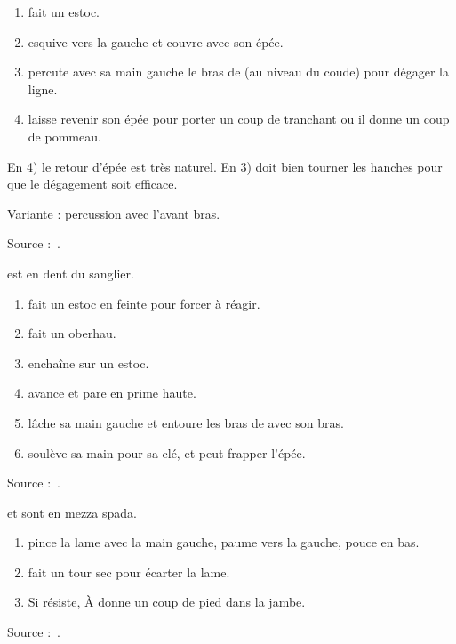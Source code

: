 \begin{technique}

\begin{enumerate}
	\item \A fait un estoc.
	\item \D esquive vers la gauche et couvre avec son épée.
	\item \D percute avec sa main gauche le bras de \A (au niveau du coude) pour dégager la ligne.
	\item \D laisse revenir son épée pour porter un coup de tranchant ou il donne un coup de pommeau.
\end{enumerate}

En 4) le retour d'épée est très naturel.
En 3) \A doit bien tourner les hanches pour que le dégagement soit efficace.

Variante : percussion avec l'avant bras.

Source :~\cite{petit:dijon:close_longword:2015}.

\end{technique}


\begin{technique}

\A est en dent du sanglier.

\begin{enumerate}
	\item \A fait un estoc en feinte pour forcer \D à réagir.
	\item \D fait un oberhau.
	\item \D enchaîne sur un estoc.
	\item \A avance et pare en prime haute.
	\item \A lâche sa main gauche et entoure les bras de \D avec son bras.
	\item \A soulève sa main pour sa clé, et peut frapper l'épée.
\end{enumerate}

Source :~\cite{petit:dijon:close_longword:2015}.

\end{technique}


\begin{technique}

\A et \D sont en mezza spada.

\begin{enumerate}
	\item \A pince la lame avec la main gauche, paume vers la gauche, pouce en bas.
	\item \A fait un tour sec pour écarter la lame.
	\item Si \D résiste, À donne un coup de pied dans la jambe.
\end{enumerate}

Source :~\cite{petit:dijon:close_longword:2015}.

\end{technique}


